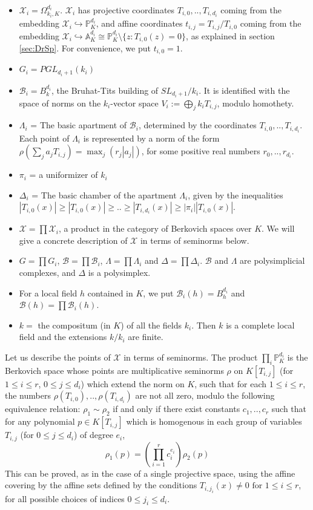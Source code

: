\documentclass{amsart}
\theoremstyle{theorem}
\theoremstyle{lemma}
\theoremstyle{prop}
\theoremstyle{definition}
\theoremstyle{corollary}
\theoremstyle{remark}
\newcommand{\A}{\mathbb{A}}
\newcommand{\B}{\mathcal{B}}
\newcommand{\X}{\mathcal{X}}
\newcommand{\PR}{\mathbb{P}}
\begin{document}
\begin{itemize}

\item
$\X_i=\Omega_{k_i,K}^{d_i}$. $\X_i$ has projective coordinates $T_{i,0},..,T_{i,d_i}$ coming from the embedding $\X_i \hookrightarrow \mathbb{P}^{d_i}_K$, and affine coordinates $t_{i,j}=T_{i,j}/T_{i,0}$ coming from the embedding $\X_i \hookrightarrow \A^{d_i}_K \cong \mathbb{P}^{d_i}_K \setminus \{ z: T_{i,0}(z) = 0 \}$, as explained in section \ref{sec:DrSp}. For convenience, we put $t_{i,0}=1$.
\item
$G_i=PGL_{d_i+1}(k_i)$
\item
$\B_i=B^{d_i}_k$, the Bruhat-Tits building of  $SL_{d_i+1}/k_i$. It is identified with the space of norms on the $k_i$-vector space $V_i:=\bigoplus_j{k_i T_{i,j}}$, modulo homothety. 
\item
$\Lambda_i$ = The basic apartment of $\B_i$, determined by the coordinates $T_{i,0},..,T_{i,d_i}$. Each point of $\Lambda_i$ is represented by a norm of the form $\rho(\sum_j a_jT_{i,j})=\max_j(r_j |a_j|)$, for some positive real numbers $r_0,..,r_{d_i}$.
\item
$\pi_i$ = a uniformizer of $k_i$
\item
$\Delta_i$ = The basic chamber of the apartment $\Lambda_i$, given by the inequalities $|T_{i,0}(x)|\geq |T_{i,0}(x)| \geq .. \geq |T_{i,d_i}(x)| \geq |\pi_i||T_{i,0}(x)|$.
\item
$\X=\prod \X_i$, a product in the category of Berkovich spaces over $K$. We will give a concrete description of $\X$ in terms of seminorms below.
\item
 $G=\prod G_i$, $\B=\prod \B_i$, $\Lambda = \prod \Lambda_i$ and $\Delta=\prod \Delta_i$. $\B$ and $\Lambda$ are polysimplicial complexes, and $\Delta$ is a polysimplex.
\item
For a local field $h$ contained in $K$, we put $\B_i(h)=B^{d_i}_h$ and $\B(h)=\prod \B_i(h)$.
\item
$k=$ the compositum (in $K$) of all the fields $k_i$. Then $k$ is a complete local field and the extensions $k/k_i$ are finite.  
\end{itemize}

Let us describe the points of $\X$ in terms of seminorms. The product $\prod_i \PR^{d_i}_K$ is the Berkovich space whose points are multiplicative seminorms $\rho$ on $K[T_{i,j}]$ (for $1\leq i\leq r$, $0 \leq j \leq d_i$) which extend the norm on $K$, such that for each $1\leq i\leq r$, the numbers $\rho(T_{i,0}),..,\rho(T_{i,d_i})$ are not all zero, modulo the following equivalence relation: $\rho_1 \sim \rho_2$ if and only if there exist constants $c_1,..,c_r$ such that for any polynomial $p \in K[T_{i,j}]$ which is homogenous in each group of variables $T_{i,j}$ (for $0\leq j \leq d_i$) of degree $e_i$, $$\rho_1(p)=(\prod_{i=1}^r c_i^{e_i}) \rho_2(p)$$
This can be proved, as in the case of a single projective space, using the affine covering by the affine sets defined by the conditions $T_{i,j_i}(x) \neq 0 \text{ for } 1\leq i \leq r$,  for all possible choices of indices $0 \leq j_i \leq d_i$. 
\end{document}
